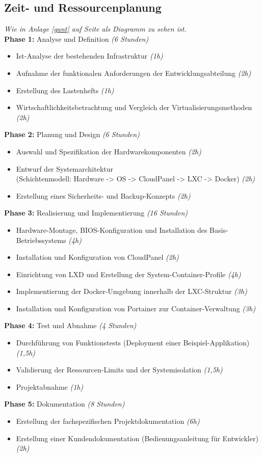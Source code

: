 \documentclass[11pt,
a4paper,
numbers=nonperiod,
footsepline,
oneside,
numbers=noenddot,
bibliography=totoc
]{scrartcl}
\begin{document}
\subsection{Zeit- und Ressourcenplanung}
\textsl{Wie in Anlage \ref{gant} auf Seite \pageref*{gant} als Diagramm zu sehen ist.}\\

\textbf{Phase 1: }Analyse und Definition \textit{(6 Stunden)}
\begin{itemize}
\item Ist-Analyse der bestehenden Infrastruktur \textit{(1h)}
\item Aufnahme der funktionalen Anforderungen der Entwicklungsabteilung \textit{(2h)}
\item Erstellung des Lastenhefts \textit{(1h)}
\item Wirtschaftlichkeitsbetrachtung und Vergleich der Virtualisierungsmethoden \textit{(2h)}
\end{itemize}
\textbf{Phase 2:} Planung und Design \textit{(6 Stunden)}
\begin{itemize}
\item	Auswahl und Spezifikation der Hardwarekomponenten \textit{(2h)}
\item Entwurf der Systemarchitektur\\
(Schichtenmodell: Hardware -> OS -> CloudPanel -> LXC -> Docker) \textit{(2h)}
\item Erstellung eines Sicherheits- und Backup-Konzepts \textit{(2h)}
\end{itemize}
\textbf{Phase 3:} Realisierung und Implementierung \textit{(16 Stunden)}
\begin{itemize}
\item Hardware-Montage, BIOS-Konfiguration und Installation des Basis-Betriebssystems \textit{(4h)}
\item Installation und Konfiguration von CloudPanel \textit{(2h)}
\item Einrichtung von LXD und Erstellung der System-Container-Profile \textit{(4h)}
\item Implementierung der Docker-Umgebung innerhalb der LXC-Struktur \textit{(3h)}
\item Installation und Konfiguration von Portainer zur Container-Verwaltung \textit{(3h)}
\end{itemize}
\textbf{Phase 4:} Test und Abnahme \textit{(4 Stunden)}
\begin{itemize}
\item Durchführung von Funktionstests (Deployment einer Beispiel-Applikation) \textit{(1,5h)}
\item Validierung der Ressourcen-Limits und der Systemisolation \textit{(1,5h)}
\item Projektabnahme \textit{(1h)}
\end{itemize}
\textbf{Phase 5: }Dokumentation \textit{(8 Stunden)}
\begin{itemize}
\item Erstellung der fachspezifischen Projektdokumentation \textit{(6h)}
\item Erstellung einer Kundendokumentation (Bedienungsanleitung für Entwickler) \textit{(2h)}
\end{itemize}
\end{document}
